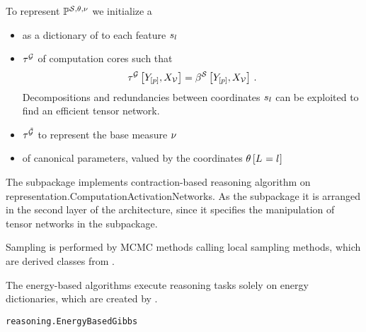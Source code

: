 \begin{example}\label{exa:expFamilyCARep}
    To represent $\mathbb{P}^{\mathcal{S},\theta,\nu}$ we initialize a
    \begin{itemize}
        \item {} as a dictionary of  to each feature $s_{l}$
        \item {} $\tau^{\mathcal{G}}$ of computation cores such that
        \begin{align*}
            \tau^{\mathcal{G}}\left[Y_{[p]},X_{\mathcal{V}}\right] = \beta^{\mathcal{S}}\left[Y_{[p]},X_{\mathcal{V}}\right] \, .
        \end{align*}
        Decompositions and redundancies between coordinates $s_{l}$ can be exploited to find an efficient tensor network.
        \item {} $\tau^{\tilde{\mathcal{G}}}$ to represent the base measure $\nu$
        \item {} of canonical parameters, valued by the coordinates $\theta\left[L_{}=l_{}\right]$
    \end{itemize}
\end{example}



\label{sec:implementationReasoning}


The \spreasoning{} subpackage implements contraction-based reasoning algorithm on representation.ComputationActivationNetworks.
As the \sprepresentation{} subpackage it is arranged in the second layer of the \tnreason{} architecture, since it specifies the manipulation of tensor networks in the \spengine{} subpackage.


Sampling is performed by MCMC methods calling local sampling methods, which are derived classes from .

The energy-based algorithms execute reasoning tasks solely on energy dictionaries, which are created by .
\begin{lstlisting}
reasoning.EnergyBasedGibbs
\end{lstlisting}


